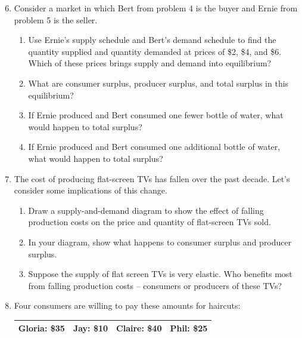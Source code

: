 \documentclass{article}
\begin{document}
\begin{enumerate}
\setcounter{enumi}{5}

\item Consider a market in which Bert from problem 4 is the buyer and Ernie from problem 5 is the seller.

	\begin{enumerate}
	
	\item Use Ernie's supply schedule and Bert's demand schedule to find the quantity supplied and quantity demanded at prices of \$2, \$4, and \$6. Which of these prices brings supply and demand into equilibrium?
	
	\item What are consumer surplus, producer surplus, and total surplus in this equilibrium?
	
	\item If Ernie produced and Bert consumed one fewer bottle of water, what would happen to total surplus?
	
	\item If Ernie produced and Bert consumed one additional bottle of water, what would happen to total surplus?
	
	\end{enumerate}
	
\item The cost of producing flat-screen TVs has fallen over the past decade. Let's consider some implications of this change.

	\begin{enumerate}
	
	\item Draw a supply-and-demand diagram to show the effect of falling production costs on the price and quantity of flat-screen TVs sold.
	
	\item In your diagram, show what happens to consumer surplus and producer surplus.
	
	\item Suppose the supply of flat screen TVs is very elastic. Who benefits most from falling production costs -- consumers or producers of these TVs?
	
	\end{enumerate}
	
\item Four consumers are willing to pay these amounts for haircuts:

	\begin{center}
	\begin{tabular}{| c | c | c | c |}
	\hline
	Gloria: \$35 & Jay: \$10 & Claire: \$40 & Phil: \$25 \\
	\hline
	\end{tabular}
	\end{center}
	

\end{enumerate}
\end{document}
